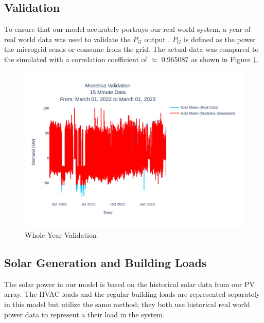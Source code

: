 \documentclass[conference]{IEEEtran}
\begin{document}
	\subsection{Validation}
		To ensure that our model accurately portrays our real world system, a year of real world data was used to validate the $P_G $ output . $P_G$ is defined as the power the microgrid sends or consume from the grid.  The actual data was compared to the simulated  with a correlation coefficient of  $\approx$ 0.965087 as shown in Figure \ref{fig:ucr15minutedatamar012022tomar012023}. 
		\begin{figure}[H]
			\centering
			\includegraphics[width=1\linewidth]{Fig/ucr_15_Minute_Data_Mar_01_2022_to_Mar_01_2023}
			\caption{Whole Year Validation}
			\label{fig:ucr15minutedatamar012022tomar012023}
		\end{figure}
		
    \subsection{Solar Generation and Building Loads}
    	The solar power in our model is based on the historical solar data from our PV array. The HVAC loads and the regular building loads are represented separately in this model but utilize the same method; they both use historical real world power data to represent a their load in the system. 
\end{document}

